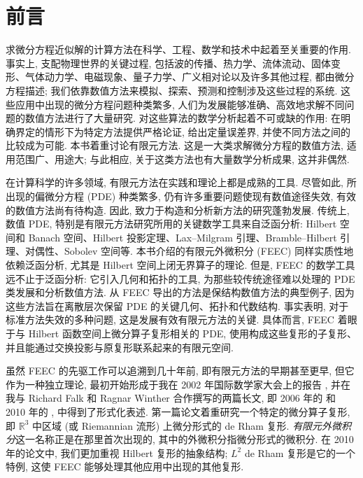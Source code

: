 \chapter*{{前言}}\label{sec:preface}

{求微分方程近似解的计算方法在科学、工程、数学和技术中起着至关重要的作用. 事实上, 支配物理世界的关键过程, 包括波的传播、热力学、流体流动、固体变形、气体动力学、电磁现象、量子力学、广义相对论以及许多其他过程, 都由微分方程描述; 我们依靠数值方法来模拟、探索、预测和控制涉及这些过程的系统. 这些应用中出现的微分方程问题种类繁多, 人们为发展能够准确、高效地求解不同问题的数值方法进行了大量研究. 对这些算法的数学分析起着不可或缺的作用: 在明确界定的情形下为特定方法提供严格论证, 给出定量误差界, 并使不同方法之间的比较成为可能. 本书着重讨论有限元方法. 这是一大类求解微分方程的数值方法, 适用范围广、用途大; 与此相应, 关于这类方法也有大量数学分析成果, 这并非偶然.}

{在计算科学的许多领域, 有限元方法在实践和理论上都是成熟的工具. 尽管如此, 所出现的偏微分方程 (PDE) 种类繁多, 仍有许多重要问题使现有数值途径失效, 有效的数值方法尚有待构造. 因此, 致力于构造和分析新方法的研究蓬勃发展. 传统上, 数值 PDE, 特别是有限元方法研究所用的关键数学工具来自泛函分析: Hilbert 空间和 Banach 空间、Hilbert 投影定理、Lax–Milgram 引理、Bramble–Hilbert 引理、对偶性、Sobolev 空间等. 本书介绍的有限元外微积分 (FEEC) 同样实质性地依赖泛函分析, 尤其是 Hilbert 空间上闭无界算子的理论. 但是, FEEC 的数学工具远不止于泛函分析: 它引入几何和拓扑的工具, 为那些较传统途径难以处理的 PDE 类发展和分析数值方法. 从 FEEC 导出的方法是保结构数值方法的典型例子, 因为这些方法旨在离散层次保留 PDE 的关键几何、拓扑和代数结构. 事实表明, 对于标准方法失效的多种问题, 这是发展有效有限元方法的关键. 具体而言, FEEC 着眼于与 Hilbert 函数空间上微分算子复形相关的 PDE, 使用构成这些复形的子复形、并且能通过交换投影与原复形联系起来的有限元空间.}

{虽然 FEEC 的先驱工作可以追溯到几十年前, 即有限元方法的早期甚至更早, 但它作为一种独立理论, 最初开始形成于我在 2002 年国际数学家大会上的报告 , 并在我与 Richard Falk 和 Ragnar Winther 合作撰写的两篇长文, 即 2006 年的  和 2010 年的 , 中得到了形式化表述. 第一篇论文着重研究一个特定的微分算子复形, 即 $\mathbb R^3$ 中区域 (或 Riemannian 流形) 上微分形式的 de Rham 复形. \emph{有限元外微积分}这一名称正是在那里首次出现的, 其中的外微积分指微分形式的微积分. 在 2010 年的论文中, 我们更加重视 Hilbert 复形的抽象结构; $L^2$ de Rham 复形是它的一个特例, 这使 FEEC 能够处理其他应用中出现的其他复形.}

